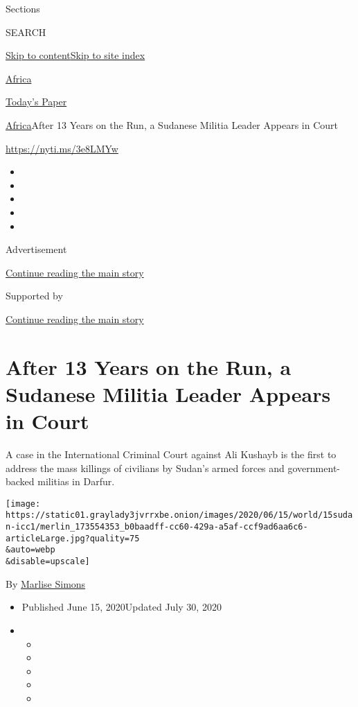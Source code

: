 Sections

SEARCH

\protect\hyperlink{site-content}{Skip to
content}\protect\hyperlink{site-index}{Skip to site index}

\href{https://www.nytimes3xbfgragh.onion/section/world/africa}{Africa}

\href{https://myaccount.nytimes3xbfgragh.onion/auth/login?response_type=cookie\&client_id=vi}{}

\href{https://www.nytimes3xbfgragh.onion/section/todayspaper}{Today's
Paper}

\href{/section/world/africa}{Africa}\textbar{}After 13 Years on the Run,
a Sudanese Militia Leader Appears in Court

\url{https://nyti.ms/3e8LMYw}

\begin{itemize}
\item
\item
\item
\item
\item
\end{itemize}

Advertisement

\protect\hyperlink{after-top}{Continue reading the main story}

Supported by

\protect\hyperlink{after-sponsor}{Continue reading the main story}

\hypertarget{after-13-years-on-the-run-a-sudanese-militia-leader-appears-in-court}{%
\section{After 13 Years on the Run, a Sudanese Militia Leader Appears in
Court}\label{after-13-years-on-the-run-a-sudanese-militia-leader-appears-in-court}}

A case in the International Criminal Court against Ali Kushayb is the
first to address the mass killings of civilians by Sudan's armed forces
and government-backed militias in Darfur.

\texttt{[image: https://static01.graylady3jvrrxbe.onion/images/2020/06/15/world/15sudan-icc1/merlin\_173554353\_b0baadff-cc60-429a-a5af-ccf9ad6aa6c6-articleLarge.jpg?quality=75\\\&auto=webp\\\&disable=upscale]}

By \href{https://www.nytimes3xbfgragh.onion/by/marlise-simons}{Marlise
Simons}

\begin{itemize}
\item
  Published June 15, 2020Updated July 30, 2020
\item
  \begin{itemize}
  \item
  \item
  \item
  \item
  \item
  \end{itemize}
\end{itemize}

